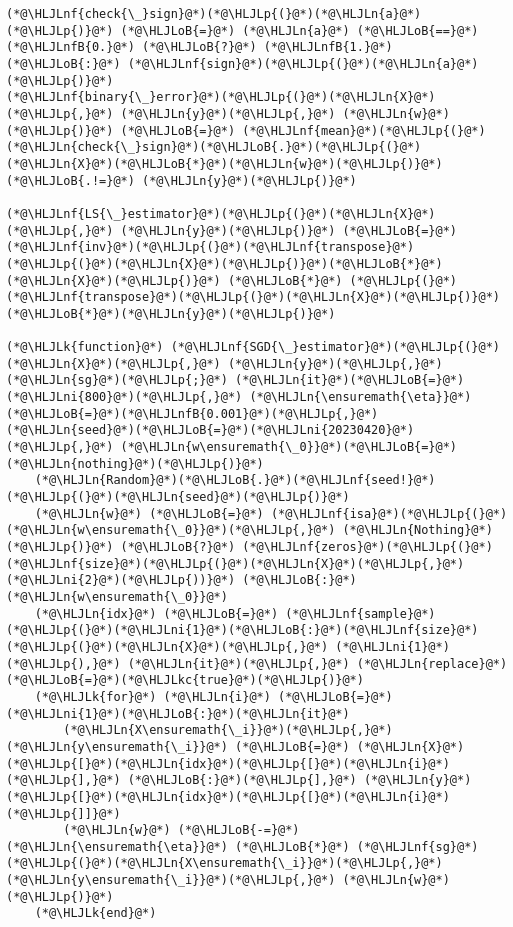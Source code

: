\documentclass[12pt,a4paper]{article}
\newcommand{\HLJLk}[1]{\textcolor[RGB]{148,91,176}{\textbf{#1}}}
\newcommand{\HLJLkc}[1]{\textcolor[RGB]{59,151,46}{\textit{#1}}}
\newcommand{\HLJLn}[1]{#1}
\newcommand{\HLJLnf}[1]{\textcolor[RGB]{66,102,213}{#1}}
\newcommand{\HLJLnfB}[1]{\textcolor[RGB]{59,151,46}{#1}}
\newcommand{\HLJLni}[1]{\textcolor[RGB]{59,151,46}{#1}}
\newcommand{\HLJLoB}[1]{\textcolor[RGB]{102,102,102}{\textbf{#1}}}
\newcommand{\HLJLp}[1]{#1}
\begin{document}
\begin{lstlisting}
(*@\HLJLnf{check{\_}sign}@*)(*@\HLJLp{(}@*)(*@\HLJLn{a}@*)(*@\HLJLp{)}@*) (*@\HLJLoB{=}@*) (*@\HLJLn{a}@*) (*@\HLJLoB{==}@*) (*@\HLJLnfB{0.}@*) (*@\HLJLoB{?}@*) (*@\HLJLnfB{1.}@*) (*@\HLJLoB{:}@*) (*@\HLJLnf{sign}@*)(*@\HLJLp{(}@*)(*@\HLJLn{a}@*)(*@\HLJLp{)}@*)
(*@\HLJLnf{binary{\_}error}@*)(*@\HLJLp{(}@*)(*@\HLJLn{X}@*)(*@\HLJLp{,}@*) (*@\HLJLn{y}@*)(*@\HLJLp{,}@*) (*@\HLJLn{w}@*)(*@\HLJLp{)}@*) (*@\HLJLoB{=}@*) (*@\HLJLnf{mean}@*)(*@\HLJLp{(}@*)(*@\HLJLn{check{\_}sign}@*)(*@\HLJLoB{.}@*)(*@\HLJLp{(}@*)(*@\HLJLn{X}@*)(*@\HLJLoB{*}@*)(*@\HLJLn{w}@*)(*@\HLJLp{)}@*) (*@\HLJLoB{.!=}@*) (*@\HLJLn{y}@*)(*@\HLJLp{)}@*)

(*@\HLJLnf{LS{\_}estimator}@*)(*@\HLJLp{(}@*)(*@\HLJLn{X}@*)(*@\HLJLp{,}@*) (*@\HLJLn{y}@*)(*@\HLJLp{)}@*) (*@\HLJLoB{=}@*) (*@\HLJLnf{inv}@*)(*@\HLJLp{(}@*)(*@\HLJLnf{transpose}@*)(*@\HLJLp{(}@*)(*@\HLJLn{X}@*)(*@\HLJLp{)}@*)(*@\HLJLoB{*}@*)(*@\HLJLn{X}@*)(*@\HLJLp{)}@*) (*@\HLJLoB{*}@*) (*@\HLJLp{(}@*)(*@\HLJLnf{transpose}@*)(*@\HLJLp{(}@*)(*@\HLJLn{X}@*)(*@\HLJLp{)}@*)(*@\HLJLoB{*}@*)(*@\HLJLn{y}@*)(*@\HLJLp{)}@*)

(*@\HLJLk{function}@*) (*@\HLJLnf{SGD{\_}estimator}@*)(*@\HLJLp{(}@*)(*@\HLJLn{X}@*)(*@\HLJLp{,}@*) (*@\HLJLn{y}@*)(*@\HLJLp{,}@*) (*@\HLJLn{sg}@*)(*@\HLJLp{;}@*) (*@\HLJLn{it}@*)(*@\HLJLoB{=}@*)(*@\HLJLni{800}@*)(*@\HLJLp{,}@*) (*@\HLJLn{\ensuremath{\eta}}@*)(*@\HLJLoB{=}@*)(*@\HLJLnfB{0.001}@*)(*@\HLJLp{,}@*) (*@\HLJLn{seed}@*)(*@\HLJLoB{=}@*)(*@\HLJLni{20230420}@*)(*@\HLJLp{,}@*) (*@\HLJLn{w\ensuremath{\_0}}@*)(*@\HLJLoB{=}@*)(*@\HLJLn{nothing}@*)(*@\HLJLp{)}@*)
    (*@\HLJLn{Random}@*)(*@\HLJLoB{.}@*)(*@\HLJLnf{seed!}@*)(*@\HLJLp{(}@*)(*@\HLJLn{seed}@*)(*@\HLJLp{)}@*)
    (*@\HLJLn{w}@*) (*@\HLJLoB{=}@*) (*@\HLJLnf{isa}@*)(*@\HLJLp{(}@*)(*@\HLJLn{w\ensuremath{\_0}}@*)(*@\HLJLp{,}@*) (*@\HLJLn{Nothing}@*)(*@\HLJLp{)}@*) (*@\HLJLoB{?}@*) (*@\HLJLnf{zeros}@*)(*@\HLJLp{(}@*)(*@\HLJLnf{size}@*)(*@\HLJLp{(}@*)(*@\HLJLn{X}@*)(*@\HLJLp{,}@*) (*@\HLJLni{2}@*)(*@\HLJLp{))}@*) (*@\HLJLoB{:}@*) (*@\HLJLn{w\ensuremath{\_0}}@*)
    (*@\HLJLn{idx}@*) (*@\HLJLoB{=}@*) (*@\HLJLnf{sample}@*)(*@\HLJLp{(}@*)(*@\HLJLni{1}@*)(*@\HLJLoB{:}@*)(*@\HLJLnf{size}@*)(*@\HLJLp{(}@*)(*@\HLJLn{X}@*)(*@\HLJLp{,}@*) (*@\HLJLni{1}@*)(*@\HLJLp{),}@*) (*@\HLJLn{it}@*)(*@\HLJLp{,}@*) (*@\HLJLn{replace}@*)(*@\HLJLoB{=}@*)(*@\HLJLkc{true}@*)(*@\HLJLp{)}@*)
    (*@\HLJLk{for}@*) (*@\HLJLn{i}@*) (*@\HLJLoB{=}@*) (*@\HLJLni{1}@*)(*@\HLJLoB{:}@*)(*@\HLJLn{it}@*)
        (*@\HLJLn{X\ensuremath{\_i}}@*)(*@\HLJLp{,}@*) (*@\HLJLn{y\ensuremath{\_i}}@*) (*@\HLJLoB{=}@*) (*@\HLJLn{X}@*)(*@\HLJLp{[}@*)(*@\HLJLn{idx}@*)(*@\HLJLp{[}@*)(*@\HLJLn{i}@*)(*@\HLJLp{],}@*) (*@\HLJLoB{:}@*)(*@\HLJLp{],}@*) (*@\HLJLn{y}@*)(*@\HLJLp{[}@*)(*@\HLJLn{idx}@*)(*@\HLJLp{[}@*)(*@\HLJLn{i}@*)(*@\HLJLp{]]}@*)
        (*@\HLJLn{w}@*) (*@\HLJLoB{-=}@*) (*@\HLJLn{\ensuremath{\eta}}@*) (*@\HLJLoB{*}@*) (*@\HLJLnf{sg}@*)(*@\HLJLp{(}@*)(*@\HLJLn{X\ensuremath{\_i}}@*)(*@\HLJLp{,}@*) (*@\HLJLn{y\ensuremath{\_i}}@*)(*@\HLJLp{,}@*) (*@\HLJLn{w}@*)(*@\HLJLp{)}@*)
    (*@\HLJLk{end}@*)
    

\end{lstlisting}
\end{document}
